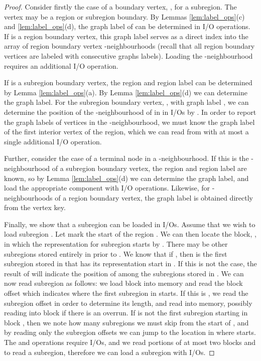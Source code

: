 \begin{proof}
Consider firstly the case of a boundary vertex, , for a subregion.
The vertex may be a region or subregion boundary.
By Lemmas \ref{lem:label_ops}(c) and \ref{lem:label_ops}(d), the graph
label of  can be determined in  I/O operations.
If  is a region boundary vertex, this graph label serves as a direct 
index into the array of region boundary vertex -neighbourhoods 
(recall that all region boundary vertices are labeled with consecutive 
graphs labels).
Loading the -neighbourhood requires an additional I/O operation.

If  is a subregion boundary vertex, the region and region
label can be determined by Lemma \ref{lem:label_ops}(a). 
By Lemma \ref{lem:label_ops}(d) we can determine the graph label. 
For the subregion boundary vertex, , with graph label , we can
determine the position of the -neighbourhood of  in
 in  I/Os by 
.
In order to report the graph labels of vertices in the
  -neighbourhood, we must know the graph label of the first
  interior vertex of the region, which we can read from
   with at most a single additional I/O operation.

  Further,  consider the case of a terminal node in a
  -neighbourhood. If this is the -neighbourhood of a
  subregion boundary vertex, the region  and region label are
  known, so by Lemma \ref{lem:label_ops}(d) we can determine the graph
  label, and load the appropriate component with  I/O
  operations. Likewise, for -neighbourhoods of a region
  boundary vertex, the graph label is obtained directly from the vertex
  key.

  Finally, we show that a subregion can be loaded in 
  I/Os. Assume that we wish to load subregion . Let  mark the start of the region . We can
  then locate the block, , in which the representation for
  subregion  starts by . 
  There may be other subregions stored entirely in  prior to
  . 
  We know that if , then  is the
  first subregion stored in  that has its representation start in
  .  
  If this is not the case, the result of
   will indicate the position
  of  among the subregions stored in .  
  We can now read subregion  as follows: 
  we load block  into memory and
  read the block offset which indicates where the first subregion in
   starts. 
  If this is , we read the subregion offset in order to
  determine its length, and read  into memory, possibly
  reading into block  if there is an overrun. 
  If  is not
  the first subregion starting in block , then we note how many
  subregions we must skip from the start of , and by reading only
  the subregion offsets we can jump to the location in  where
   starts. 
  The  and  operations require
   I/Os, and we read portions of at most two blocks  and
   to read a subregion, therefore we can load a subregion with 
  I/Os.
\end{proof}


